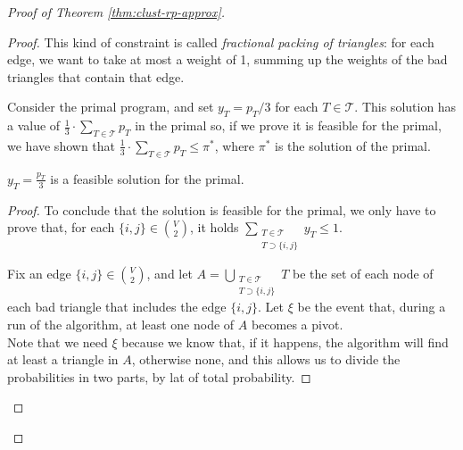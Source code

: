 \begin{proof}[Proof of Theorem \ref{thm:clust-rp-approx}]
\begin{proof}
        \obs This kind of constraint is called \textit{fractional packing of triangles}: for each edge, we want to take at most a weight of 1, summing up the weights of the bad triangles that contain that edge.
    
        Consider the primal program, and set $y_T = p_T / 3$ for each $T \in \mathscr{T}$. This solution has a value of $\frac13 \cdot \sum_{T \in \mathscr{T}} p_T$ in the primal so, if we prove it is feasible for the primal, we have shown that $\frac13 \cdot \sum_{T \in \mathscr{T}} p_T \le \pi^{*}$, where $\pi^{*}$ is the solution of the primal.
    
        \begin{lem}\label{l:clust-4}
            $y_T = \frac{p_T}{3}$ is a feasible solution for the primal.
        \end{lem}
    
        \begin{proof}
            To conclude that the solution is feasible for the primal, we only have to prove that, for each $\{i,j\} \in \binom V2$, it holds
            $\sum_{\substack{T \in \mathscr{T}\\T \supset \{i,j\}}} y_T \le 1$.
        
            Fix an edge $\{i,j\} \in \binom V2$, and let $A = \bigcup_{\substack{T \in \mathscr{T}\\T \supset \{i,j\}}} T$ be the set of each node of each bad triangle that includes the edge $\{i,j\}$. Let $\xi$ be the event that, during a run of the algorithm, at least one node of $A$ becomes a pivot.\\
            Note that we need $\xi$ because we know that, if it happens, the algorithm will find at least a triangle in $A$, otherwise none, and this allows us to divide the probabilities in two parts, by lat of total probability.
        

\end{proof}
\end{proof}
\end{proof}
